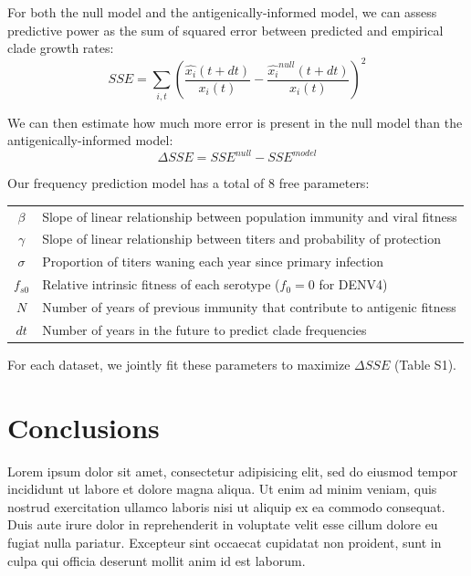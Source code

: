 For both the null model and the antigenically-informed model, we can assess predictive power as the sum of squared error between predicted and empirical clade growth rates:
\begin{equation}
  \label{eq_sse}
SSE = \sum_{i,t} \left( \frac{\hat{x_i}(t+dt)}{x_i(t)} - \frac{\hat{x_i}^{null}(t+dt)}{x_i(t)} \right)^2
\end{equation}

We can then estimate how much more error is present in the null model than the antigenically-informed model:
\begin{equation}
  \label{eq_delta_sse}
\Delta SSE = SSE^{null} - SSE^{model}
\end{equation}

Our frequency prediction model has a total of 8 free parameters:
\begin{table}[h!]
  \begin{center}
    \label{parameter_definition}
    \begin{tabular}{c|l}
      $\beta$ & Slope of linear relationship between population immunity and viral fitness\\
      $\gamma$ & Slope of linear relationship between titers and probability of protection\\
      $\sigma$ & Proportion of titers waning each year since primary infection\\
      $f_{s0}$ & Relative intrinsic fitness of each serotype ($f_0 = 0$ for DENV4)\\
      $N$ & Number of years of previous immunity that contribute to antigenic fitness\\
      $dt$ & Number of years in the future to predict clade frequencies\\
    \end{tabular}
  \end{center}
\end{table}

For each dataset, we jointly fit these parameters to maximize $\Delta SSE$ (Table S1).



\chapter{Conclusions}
Lorem ipsum dolor sit amet, consectetur adipisicing elit, sed do eiusmod tempor incididunt ut labore et dolore magna aliqua. Ut enim ad minim veniam, quis nostrud exercitation ullamco laboris nisi ut aliquip ex ea commodo consequat. Duis aute irure dolor in reprehenderit in voluptate velit esse cillum dolore eu fugiat nulla pariatur. Excepteur sint occaecat cupidatat non proident, sunt in culpa qui officia deserunt mollit anim id est laborum.

